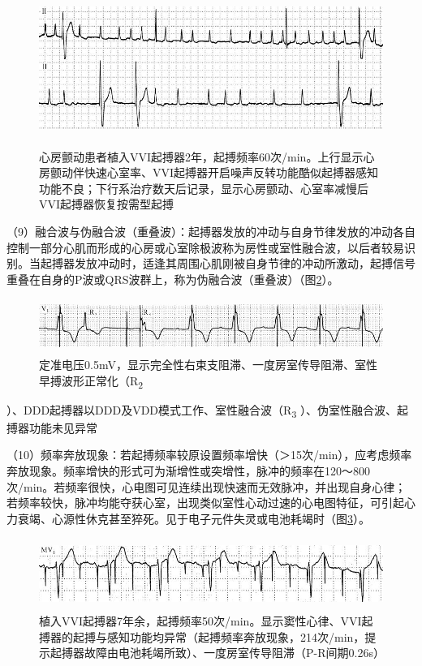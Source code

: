\begin{figure}[!htbp]
 \centering
 \includegraphics[width=5.58333in,height=1.98958in]{./images/Image00609.jpg}
 \captionsetup{justification=centering}
 \caption{心房颤动患者植入VVI起搏器2年，起搏频率60次/min。上行显示心房颤动伴快速心室率、VVI起搏器开启噪声反转功能酷似起搏器感知功能不良；下行系治疗数天后记录，显示心房颤动、心室率减慢后VVI起搏器恢复按需型起搏}
 \label{fig38-6}
  \end{figure} 

（9）融合波与伪融合波（重叠波）：起搏器发放的冲动与自身节律发放的冲动各自控制一部分心肌而形成的心房或心室除极波称为房性或室性融合波，以后者较易识别。当起搏器发放冲动时，适逢其周围心肌刚被自身节律的冲动所激动，起搏信号重叠在自身的P波或QRS波群上，称为伪融合波（重叠波）（图\ref{fig38-7}）。

\begin{figure}[!htbp]
 \centering
 \includegraphics[width=5.58333in,height=0.69792in]{./images/Image00610.jpg}
 \captionsetup{justification=centering}
 \caption{定准电压0.5mV，显示完全性右束支阻滞、一度房室传导阻滞、室性早搏波形正常化（R\textsubscript{2}}
 \label{fig38-7}
  \end{figure} 
）、DDD起搏器以DDD及VDD模式工作、室性融合波（R\textsubscript{3}
）、伪室性融合波、起搏器功能未见异常

（10）频率奔放现象：若起搏频率较原设置频率增快（＞15次/min），应考虑频率奔放现象。频率增快的形式可为渐增性或突增性，脉冲的频率在120～800次/min。若频率很快，心电图可见连续出现快速而无效脉冲，并出现自身心律；若频率较快，脉冲均能夺获心室，出现类似室性心动过速的心电图特征，可引起心力衰竭、心源性休克甚至猝死。见于电子元件失灵或电池耗竭时（图\ref{fig38-8}）。

\begin{figure}[!htbp]
 \centering
 \includegraphics[width=5.58333in,height=0.91667in]{./images/Image00611.jpg}
 \captionsetup{justification=centering}
 \caption{植入VVI起搏器7年余，起搏频率50次/min。显示窦性心律、VVI起搏器的起搏与感知功能均异常（起搏频率奔放现象，214次/min，提示起搏器故障由电池耗竭所致）、一度房室传导阻滞（P-R间期0.26s）}
 \label{fig38-8}
  \end{figure} 

